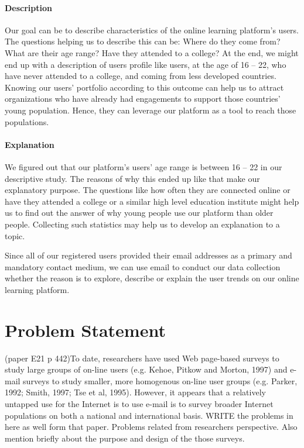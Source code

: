 \paragraph{Description}
Our goal can be to describe characteristics of the online learning platform's users. The questions helping us to describe this can be: Where do they come from? What are their age range? Have they attended to a college? At the end, we might end up with a description of users profile like users, at the age of 16 -- 22, who have never attended to a college, and coming from less developed countries. Knowing our users' portfolio according to this outcome can help us to attract organizations who have already had engagements to support those countries' young population. Hence, they can leverage our platform as a tool to reach those populations.

\paragraph{Explanation}
We figured out that our platform's users' age range is between 16 -- 22 in our descriptive study. The reasons of why this ended up like that make our explanatory purpose. The questions like how often they are connected online or have they attended a college or a similar high level education institute might help us to find out the answer of why young people use our platform than older people. Collecting such statistics may help us to develop an explanation to a topic.

\vspace{1cm}
Since all of our registered users provided their email addresses as a primary and mandatory contact medium, we can use email to conduct our data collection whether the reason is to explore, describe or explain the user trends on our online learning platform.

\section{Problem Statement}
\label{sec:2:Problem}
(paper E21 p 442)To date, researchers have used Web page-based surveys to study large groups of on-line users (e.g. Kehoe, Pitkow and Morton, 1997) and e-mail surveys to study smaller, more homogenous on-line user groups (e.g. Parker, 1992; Smith, 1997; Tse et al, 1995). However, it appears that a relatively untapped use for the Internet is to use e-mail is to survey broader Internet populations on both a national and international basis. WRITE the problems in here as well form that paper. Problems related from researchers perspective. Also mention briefly about the purpose and design of the those surveys.

